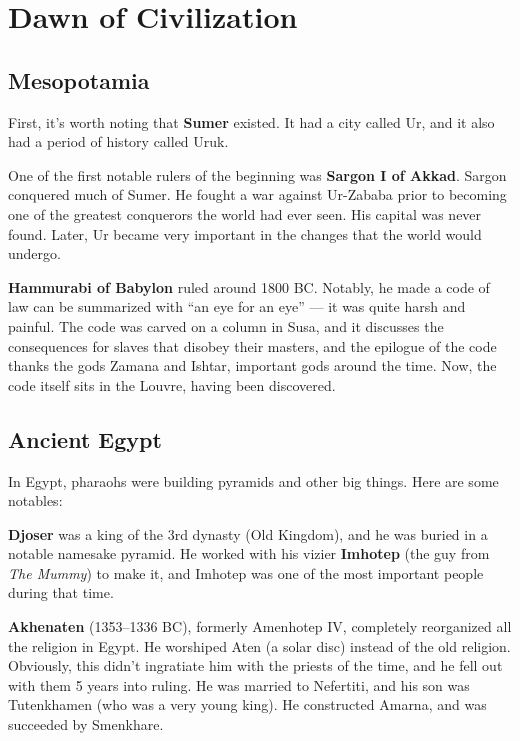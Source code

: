 \chapter{Dawn of Civilization}

\section{Mesopotamia}

First, it's worth noting that \textbf{Sumer} existed.
It had a city called Ur, and it also had a period of history called Uruk.

One of the first notable rulers of the beginning was \textbf{Sargon I of Akkad}.
Sargon conquered much of Sumer.
He fought a war against Ur-Zababa prior to becoming one of the greatest conquerors the world had ever seen.
His capital was never found.
Later, Ur became very important in the changes that the world would undergo.

\textbf{Hammurabi of Babylon} ruled around 1800 BC\@.
Notably, he made a code of law can be summarized with ``an eye for an eye'' --- it was quite harsh and painful.
The code was carved on a column in Susa,
and it discusses the consequences for slaves that disobey their masters,
and the epilogue of the code thanks the gods Zamana and Ishtar, important gods around the time.
Now, the code itself sits in the Louvre, having been discovered.

\section{Ancient Egypt}

In Egypt, pharaohs were building pyramids and other big things. Here are some notables:

\textbf{Djoser} was a king of the 3rd dynasty (Old Kingdom),
and he was buried in a notable namesake pyramid.
He worked with his vizier \textbf{Imhotep} (the guy from \textit{The Mummy})
to make it, and Imhotep was one of the most important people during that time.

\textbf{Akhenaten} (1353--1336 BC), formerly Amenhotep IV, completely reorganized all the religion in Egypt.
He worshiped Aten (a solar disc) instead of the old religion.
Obviously, this didn't ingratiate him with the priests of the time, and he fell out with them 5 years into ruling.
He was married to Nefertiti, and his son was Tutenkhamen (who was a very young king).
He constructed Amarna, and was succeeded by Smenkhare.

